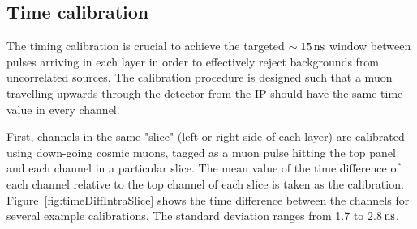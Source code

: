 \documentclass[12pt]{article}
\newcommand{\unit}[1]{\ensuremath{\text{\,#1}}\xspace}
\begin{document}
\subsection{Time calibration}
\label{sec:timeCalibration}

The timing calibration is crucial to achieve the targeted $\sim15\unit{ns}$ 
window between pulses arriving in each layer in order to effectively 
reject backgrounds from uncorrelated sources. The calibration
procedure is designed such that a muon travelling upwards through the detector 
from the IP should have the same time
value in every channel.

First, channels in the same "slice" (left or right side of each layer) are calibrated 
using down-going cosmic muons, tagged as a muon pulse hitting the top panel and 
each channel in a particular slice. The mean value of the time difference of each channel relative to the top channel of each slice 
is taken as the calibration. Figure~\ref{fig:timeDiffIntraSlice} shows the time difference between the channels for several example calibrations.
The standard deviation ranges from 1.7 to 2.8\unit{ns}.
\end{document}
